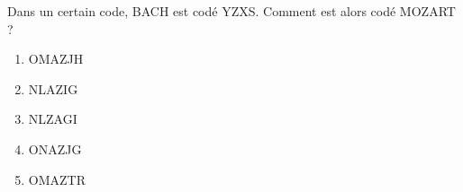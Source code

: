 Dans un certain code, BACH est codé YZXS. Comment est alors codé MOZART ?
\begin{multicols}{5}
  \begin{enumerate}[A/]
  \item OMAZJH
  \item NLAZIG
  \item NLZAGI
  \item ONAZJG
  \item OMAZTR
  \end{enumerate}
\end{multicols}
